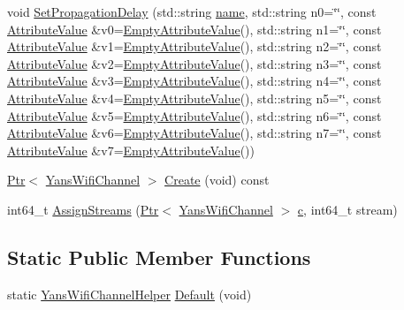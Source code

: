 \begin{DoxyCompactItemize}
void \hyperlink{classns3_1_1YansWifiChannelHelper_a6b452ba53ccaee6ca000cc72ed9ea0fa}{Set\+Propagation\+Delay} (std\+::string \hyperlink{generate__test__data__lte__spectrum__model_8m_ab74e6bf80237ddc4109968cedc58c151}{name}, std\+::string n0=\char`\"{}\char`\"{}, const \hyperlink{classns3_1_1AttributeValue}{Attribute\+Value} \&v0=\hyperlink{classns3_1_1EmptyAttributeValue}{Empty\+Attribute\+Value}(), std\+::string n1=\char`\"{}\char`\"{}, const \hyperlink{classns3_1_1AttributeValue}{Attribute\+Value} \&v1=\hyperlink{classns3_1_1EmptyAttributeValue}{Empty\+Attribute\+Value}(), std\+::string n2=\char`\"{}\char`\"{}, const \hyperlink{classns3_1_1AttributeValue}{Attribute\+Value} \&v2=\hyperlink{classns3_1_1EmptyAttributeValue}{Empty\+Attribute\+Value}(), std\+::string n3=\char`\"{}\char`\"{}, const \hyperlink{classns3_1_1AttributeValue}{Attribute\+Value} \&v3=\hyperlink{classns3_1_1EmptyAttributeValue}{Empty\+Attribute\+Value}(), std\+::string n4=\char`\"{}\char`\"{}, const \hyperlink{classns3_1_1AttributeValue}{Attribute\+Value} \&v4=\hyperlink{classns3_1_1EmptyAttributeValue}{Empty\+Attribute\+Value}(), std\+::string n5=\char`\"{}\char`\"{}, const \hyperlink{classns3_1_1AttributeValue}{Attribute\+Value} \&v5=\hyperlink{classns3_1_1EmptyAttributeValue}{Empty\+Attribute\+Value}(), std\+::string n6=\char`\"{}\char`\"{}, const \hyperlink{classns3_1_1AttributeValue}{Attribute\+Value} \&v6=\hyperlink{classns3_1_1EmptyAttributeValue}{Empty\+Attribute\+Value}(), std\+::string n7=\char`\"{}\char`\"{}, const \hyperlink{classns3_1_1AttributeValue}{Attribute\+Value} \&v7=\hyperlink{classns3_1_1EmptyAttributeValue}{Empty\+Attribute\+Value}())
\item 
\hyperlink{classns3_1_1Ptr}{Ptr}$<$ \hyperlink{classns3_1_1YansWifiChannel}{Yans\+Wifi\+Channel} $>$ \hyperlink{classns3_1_1YansWifiChannelHelper_a0532e292ab9452f3cf630c848708e563}{Create} (void) const 
\item 
int64\+\_\+t \hyperlink{classns3_1_1YansWifiChannelHelper_ab409a15cfb8abb5195177625191e2584}{Assign\+Streams} (\hyperlink{classns3_1_1Ptr}{Ptr}$<$ \hyperlink{classns3_1_1YansWifiChannel}{Yans\+Wifi\+Channel} $>$ \hyperlink{mmwave_2model_2fading-traces_2fading__trace__generator_8m_ae0323a9039add2978bf5b49550572c7c}{c}, int64\+\_\+t stream)
\end{DoxyCompactItemize}
\subsection*{Static Public Member Functions}
\begin{DoxyCompactItemize}
\item 
static \hyperlink{classns3_1_1YansWifiChannelHelper}{Yans\+Wifi\+Channel\+Helper} \hyperlink{classns3_1_1YansWifiChannelHelper_a9a7fb65955fd9eb046600b89292e8062}{Default} (void)
\end{DoxyCompactItemize}
